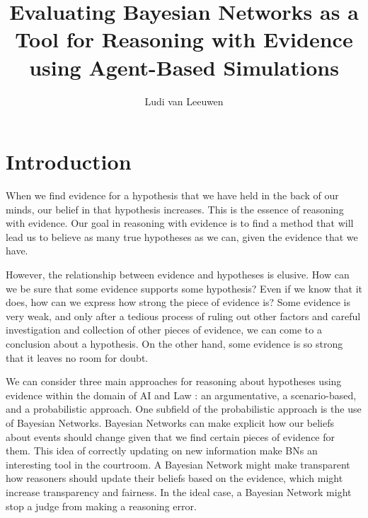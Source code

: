 \documentclass[11pt]{article}
\title{Evaluating Bayesian Networks as a Tool for Reasoning with Evidence using Agent-Based Simulations}
\author{Ludi van Leeuwen}
\date{}                                           %
\begin{document}
\maketitle


\section{Introduction}
When we find evidence for a hypothesis that we have held in the back of our minds, our belief in that hypothesis increases. This is the essence of reasoning with evidence. Our goal in reasoning with evidence is to find a method that will lead us to believe as many true hypotheses as we can, given the evidence that we have.

However, the relationship between evidence and hypotheses is elusive. How can we be sure that some evidence supports some hypothesis? Even if we know that it does, how can we express how strong the piece of evidence is? Some evidence is very weak, and only after a tedious process of ruling out other factors and careful investigation and collection of other pieces of evidence, we can come to a conclusion about a hypothesis. On the other hand, some evidence is so strong that it leaves no room for doubt.

We can consider three main approaches for reasoning about hypotheses using evidence within the domain of AI and Law \citep{diBelloVerheij2018}: an argumentative, a scenario-based, and a probabilistic approach. One subfield of the probabilistic approach is the use of Bayesian Networks. Bayesian Networks can make explicit how our beliefs about events should change given that we find certain pieces of evidence for them. This idea of correctly updating on new information make BNs an interesting tool in the courtroom. A Bayesian Network might make transparent how reasoners should update their beliefs based on the evidence, which might increase transparency and fairness. In the ideal case, a Bayesian Network might stop a judge from making a reasoning error.
\end{document}
